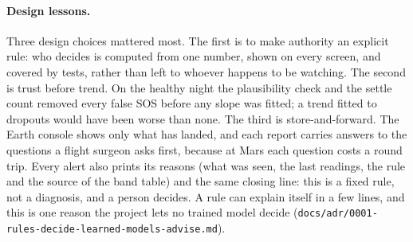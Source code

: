 \paragraph{Design lessons.}
Three design choices mattered most. The first is to make authority an explicit rule: who decides is computed from one number, shown on every screen, and covered by tests, rather than left to whoever happens to be watching. The second is trust before trend. On the healthy night the plausibility check and the settle count removed every false SOS before any slope was fitted; a trend fitted to dropouts would have been worse than none. The third is store-and-forward. The Earth console shows only what has landed, and each report carries answers to the questions a flight surgeon asks first, because at Mars each question costs a round trip. Every alert also prints its reasons (what was seen, the last readings, the rule and the source of the band table) and the same closing line: this is a fixed rule, not a diagnosis, and a person decides. A rule can explain itself in a few lines, and this is one reason the project lets no trained model decide (\nolinkurl{docs/adr/0001-rules-decide-learned-models-advise.md}).

